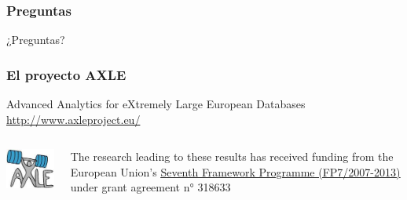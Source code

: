 \frame
{ \frametitle{Preguntas}
	\begin{center}
		\Huge ¿Preguntas?
	\end{center}
}

\frame
{ \frametitle{El proyecto AXLE}

		Advanced Analytics for eXtremely Large European Databases \\

		\raggedleft
		{\LARGE \url{http://www.axleproject.eu/} }

	\vfill

\begin{columns}

\begin{column}{0.3\textwidth}
	\href{http://www.axleproject.eu/}{\includegraphics{axle-logo-weights.jpg}}
\end{column}
\begin{column}{0.7\textwidth}
\raggedleft \footnotesize
The research leading to these results has received funding from the European Union's \href{http://ec.europa.eu/research/fp7/index_en.cfm}{\underline{Seventh Framework Programme (FP7/2007-2013)}} under grant agreement n° 318633
\end{column}
\end{columns}
}
